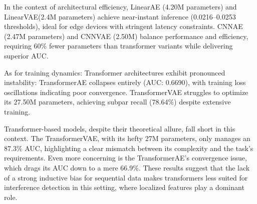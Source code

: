 \documentclass[12pt]{article}
\begin{document}
In the context of architectural efficiency, LinearAE (4.20M parameters) and LinearVAE(2.4M parameters) achieve near-instant inference (0.0216–0.0253 thresholds), ideal for edge devices with stringent latency constraints.  CNNAE (2.47M parameters) and CNNVAE (2.50M) balance performance and efficiency, requiring 60\% fewer parameters than transformer variants while delivering superior AUC.

As for training dynamics: Transformer architectures exhibit pronounced instability:  TransformerAE collapses entirely (AUC: 0.6690), with training loss oscillations indicating poor convergence.  TransformerVAE struggles to optimize its 27.50M parameters, achieving subpar recall (78.64\%) despite extensive training.


Transformer-based models, despite their theoretical allure, fall short in this context. The TransformerVAE, with its hefty 27M parameters, only manages an 87.3\% AUC, highlighting a clear mismatch between its complexity and the task’s requirements. Even more concerning is the TransformerAE’s convergence issue, which drags its AUC down to a mere 66.9\%. These results suggest that the lack of a strong inductive bias for sequential data makes transformers less suited for interference detection in this setting, where localized features play a dominant role.
\end{document}
